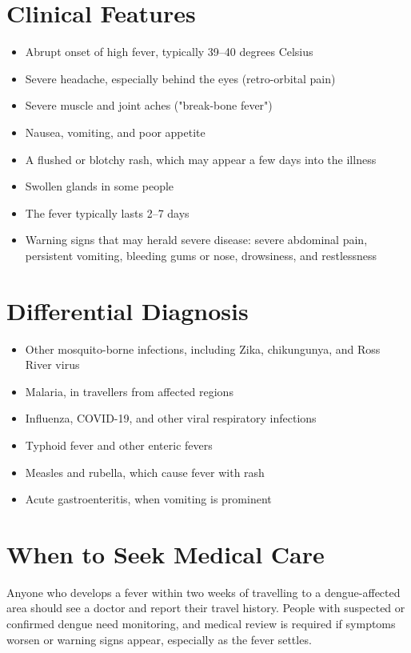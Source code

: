 \section*{Clinical Features}
\begin{itemize}
    \item Abrupt onset of high fever, typically 39--40 degrees Celsius
    \item Severe headache, especially behind the eyes (retro-orbital pain)
    \item Severe muscle and joint aches ("break-bone fever")
    \item Nausea, vomiting, and poor appetite
    \item A flushed or blotchy rash, which may appear a few days into the illness
    \item Swollen glands in some people
    \item The fever typically lasts 2--7 days
    \item Warning signs that may herald severe disease: severe abdominal pain, persistent vomiting, bleeding gums or nose, drowsiness, and restlessness
\end{itemize}

\section*{Differential Diagnosis}
\begin{itemize}
    \item Other mosquito-borne infections, including Zika, chikungunya, and Ross River virus
    \item Malaria, in travellers from affected regions
    \item Influenza, COVID-19, and other viral respiratory infections
    \item Typhoid fever and other enteric fevers
    \item Measles and rubella, which cause fever with rash
    \item Acute gastroenteritis, when vomiting is prominent
\end{itemize}

\section*{When to Seek Medical Care}
Anyone who develops a fever within two weeks of travelling to a dengue-affected area should see a doctor and report their travel history. People with suspected or confirmed dengue need monitoring, and medical review is required if symptoms worsen or warning signs appear, especially as the fever settles.

